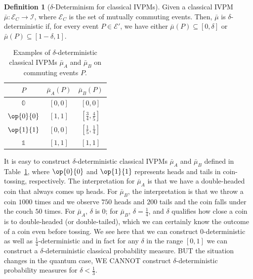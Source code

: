 \documentclass[english,reprint, aps, prl,superscriptaddress, showpacs,
showkeys, longbibliography, amsmath, amssymb, floatfix]{revtex4-1}
\theoremstyle{plain}
\theoremstyle{definition}
\newtheorem{definition}{Definition}
\newcommand{\events}{\ensuremath{\mathcal{E}}}
\newcommand{\imposs}{\ensuremath{\left[0,0\right]}}
\newcommand{\necess}{\ensuremath{\left[1,1\right]}}
\newcommand{\proj}[1]{\op{#1}{#1}}
\newcommand{\eventsC}{\ensuremath{\events_{C}}}
\begin{document}
\begin{definition}[$\delta$-Determinism for classical IVPMs]\label{def:delta-deterministic-classical}
Given a classical IVPM~$\bar{\mu}:\eventsC\rightarrow\mathscr{I}$,
where $\eventsC$ is the set of mutually commuting events. Then, $\bar{\mu}$
is $\delta$-deterministic if, for every event $P\in\events'$, we
have either $\bar{\mu}\left(P\right)\subseteq\left[0,\delta\right]$
or $\bar{\mu}\left(P\right)\subseteq\left[1-\delta,1\right]$. \end{definition}

\begin{table}
\noindent \centering{}\caption{\label{tab:classical-IVPMs}Examples of $\delta$-deterministic classical
IVPMs $\bar{\mu}_{A}$ and $\bar{\mu}_{B}$ on commuting events $P$.}
\begin{tabular}{ccc}
\toprule 
\addlinespace
$P$  & $\bar{\mu}_{A}(P)$  & $\bar{\mu}_{B}(P)$ \tabularnewline
\midrule
\midrule 
\addlinespace
$\mathbb{0}$  & $\imposs$  & $\imposs$ \tabularnewline
\midrule 
\addlinespace
$\proj{0}$  & $\necess$  & $\left[\frac{3}{4},\frac{4}{5}\right]$ \tabularnewline
\midrule 
\addlinespace
$\proj{1}$  & $\imposs$  & $\left[\frac{1}{5},\frac{1}{4}\right]$ \tabularnewline
\midrule 
\addlinespace
$\mathbb{1}$  & $\necess$  & $\necess$ \tabularnewline
\bottomrule
\end{tabular}
\end{table}

\noindent It is easy to construct $\delta$-deterministic classical
IVPMs $\bar{\mu}_{A}$ and $\bar{\mu}_{B}$ defined in Table~\ref{tab:classical-IVPMs},
where $\proj{0}$ and $\proj{1}$ represents heads and tails in coin-tossing,
respectively. The interpretation for $\bar{\mu}_{A}$ is that we have
a double-headed coin that always comes up heads. For $\bar{\mu}_{B}$,
the interpretation is that we throw a coin $1000$ times and we observe
$750$ heads and $200$ tails and the coin falls under the couch $50$
times. For $\bar{\mu}_{A}$, $\delta$ is $0$; for $\bar{\mu}_{B}$,
$\delta=\frac{1}{4}$, and $\delta$ qualifies how close a coin is
to double-headed (or double-tailed), which we can certainly know the
outcome of a coin even before tossing. We see here that we can construct
$0$-deterministic as well as $\frac{1}{4}$-deterministic and in
fact for any $\delta$ in the range $\left[0,1\right]$ we can construct
a $\delta$-deterministic classical probability measure. BUT the situation
changes in the quantum case, WE CANNOT construct $\delta$-deterministic
probability measures for $\delta<\frac{1}{3}$.
\end{document}
